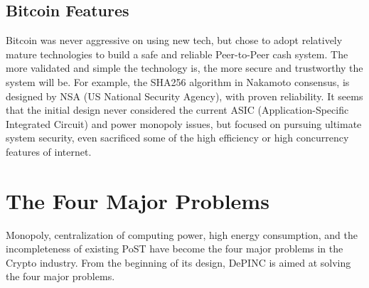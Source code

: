 \subsection{Bitcoin Features}
\begin{flushleft}
    Bitcoin was never aggressive on using new tech, but chose to adopt relatively mature technologies to build a safe and reliable Peer-to-Peer cash system. The more validated and simple the technology is, the more secure and trustworthy the system will be. For example, the SHA256 algorithm in Nakamoto consensus, is designed by NSA (US National Security Agency), with proven reliability. It seems that the initial design never considered the current ASIC (Application-Specific Integrated Circuit) and power monopoly issues, but focused on pursuing ultimate system security, even sacrificed some of the high efficiency or high concurrency features of internet.
\end{flushleft}
\section{The Four Major Problems}
\begin{flushleft}
    Monopoly, centralization of computing power, high energy consumption, and the incompleteness of existing PoST have become the four major problems in the Crypto industry. From the beginning of its design, DePINC is aimed at solving the four major problems.
\end{flushleft}
